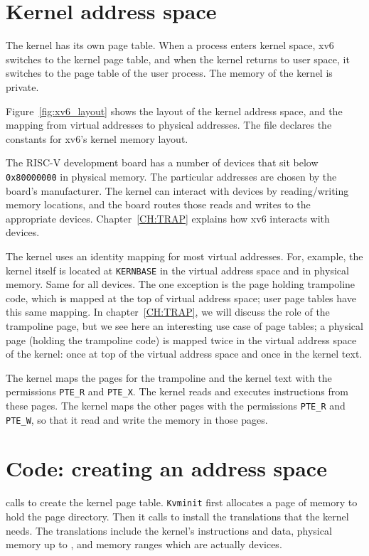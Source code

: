 \section{Kernel address space}
The kernel has its own page table.  When a process enters kernel
space, xv6 switches to the kernel page table, and when the kernel
returns to user space, it switches to the page table of the user
process.  The memory of the kernel is private.

Figure~\ref{fig:xv6_layout}
shows the layout of the kernel address space, and the mapping from
virtual addresses to physical addresses.  The file
declares the constants for xv6's kernel memory layout.

The RISC-V development board has a number of
devices that sit below
\texttt{0x80000000}
in physical memory. The particular addresses are chosen by the board's
manufacturer.  The kernel can interact with devices by reading/writing
memory locations, and the board routes those reads and writes to the
appropriate devices.  Chapter~\ref{CH:TRAP} explains
how xv6 interacts with devices.

The kernel uses an identity mapping for most virtual addresses.  For,
example, the kernel itself is located at
\lstinline{KERNBASE}
in the virtual address space and in physical memory.  Same for all
devices.  The one exception is the page holding trampoline code, which
is mapped at the top of virtual address space; user page tables have
this same mapping.  In chapter~\ref{CH:TRAP}, we will discuss the role
of the trampoline page, but we see here an interesting use case of
page tables; a physical page (holding the trampoline code) is
mapped twice in the virtual address space of the kernel: once at top
of the virtual address space and once in the kernel text.

The kernel maps the pages for the trampoline and the kernel text with
the permissions
\lstinline{PTE_R}
and
\lstinline{PTE_X}.
The kernel reads and executes instructions from these pages.
The kernel maps the other pages with the permissions
\lstinline{PTE_R}
and
\lstinline{PTE_W},
so that it read and write the memory in those pages.

\section{Code: creating an address space}

calls
to create the kernel page table.
\lstinline{Kvminit}
first allocates a page of memory to hold the page directory.
Then it calls
to install the translations that the kernel needs.
The translations include the kernel's
instructions and data, physical memory up to
,
and memory ranges which are actually devices.

